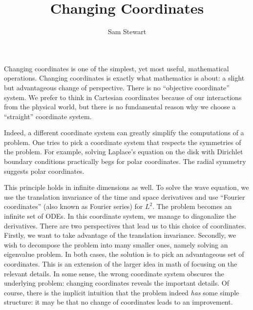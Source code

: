 \documentclass[12pt,letterpaper,boxed]{jhwhw}
\author{Sam Stewart}
\title{Changing Coordinates}
\begin{document}
Changing coordinates is one of the simplest, yet most useful, mathematical operations. Changing coordinates is exactly what mathematics is about: a slight but advantageous change of perspective. There is no ``objective coordinate'' system. We prefer to think in Cartesian coordinates because of our interactions from the physical world, but there is no fundamental reason why we choose a ``straight'' coordinate system. 

Indeed, a different coordinate system can greatly simplify the computations of a problem. One tries to pick a coordinate system that respects the symmetries of the problem. For example, solving Laplace's equation on the disk with Dirichlet boundary conditions practically begs for polar coordinates. The radial symmetry suggests polar coordinates.

This principle holds in infinite dimensions as well. To solve the wave equation, we use the translation invariance of the time and space derivatives and use ``Fourier coordinates'' (also known as Fourier series) for $L^2$. The problem becomes an infinite set of ODEs. In this coordinate system, we manage to diagonalize the derivatives. There are two perspectives that lead us to this choice of coordinates. Firstly, we want to take advantage of the translation invariance. Secondly, we wish to decompose the problem into many smaller ones, namely solving an eigenvalue problem. In both cases, the solution is to pick an advantageous set of coordinates. This is an extension of the larger idea in math of focusing on the relevant details. In some sense, the wrong coordinate system obscures the underlying problem: changing coordinates reveals the important details. Of course, there is the implicit intuition that the problem indeed \textit{has} some simple structure: it may be that no change of coordinates leads to an improvement.

\end{document}
